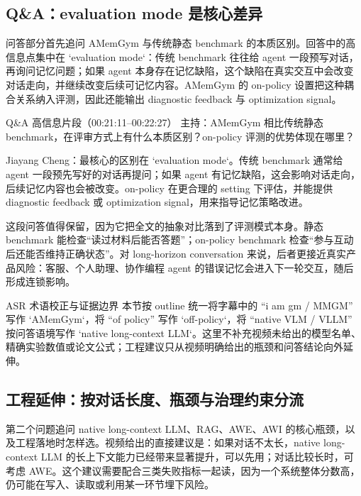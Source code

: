 \subsection{Q\&A：evaluation mode 是核心差异}

问答部分首先追问 AMemGym 与传统静态 benchmark 的本质区别。回答中的高信息点集中在 `evaluation mode`：传统 benchmark 往往给 agent 一段预写对话，再询问记忆问题；如果 agent 本身存在记忆缺陷，这个缺陷在真实交互中会改变对话走向，并继续改变后续可记忆内容。AMemGym 的 on-policy 设置把这种耦合关系纳入评测，因此还能输出 diagnostic feedback 与 optimization signal。

\begin{dialoguebox}{Q\&A 高信息片段（00:21:11--00:22:27）}
主持：AMemGym 相比传统静态 benchmark，在评审方式上有什么本质区别？on-policy 评测的优势体现在哪里？

Jiayang Cheng：最核心的区别在 `evaluation mode`。传统 benchmark 通常给 agent 一段预先写好的对话再提问；如果 agent 有记忆缺陷，这会影响对话走向，后续记忆内容也会被改变。on-policy 在更合理的 setting 下评估，并能提供 diagnostic feedback 或 optimization signal，用来指导记忆策略改进。
\end{dialoguebox}

这段问答值得保留，因为它把全文的抽象对比落到了评测模式本身。静态 benchmark 能检查“读过材料后能否答题”；on-policy benchmark 检查“参与互动后还能否维持正确状态”。对 long-horizon conversation 来说，后者更接近真实产品风险：客服、个人助理、协作编程 agent 的错误记忆会进入下一轮交互，随后形成连锁影响。

\begin{warningbox}{ASR 术语校正与证据边界}
本节按 outline 统一将字幕中的 “i am gm / MMGM” 写作 `AMemGym`，将 “of policy” 写作 `off-policy`，将 “native VLM / VLLM” 按问答语境写作 `native long-context LLM`。这里不补充视频未给出的模型名单、精确实验数值或论文公式；工程建议只从视频明确给出的瓶颈和问答结论向外延伸。
\end{warningbox}

\subsection{工程延伸：按对话长度、瓶颈与治理约束分流}

第二个问题追问 native long-context LLM、RAG、AWE、AWI 的核心瓶颈，以及工程落地时怎样选。视频给出的直接建议是：如果对话不太长，native long-context LLM 的长上下文能力已经带来显著提升，可以先用；对话比较长时，可考虑 AWE。这个建议需要配合三类失败指标一起读，因为一个系统整体分数高，仍可能在写入、读取或利用某一环节埋下风险。

